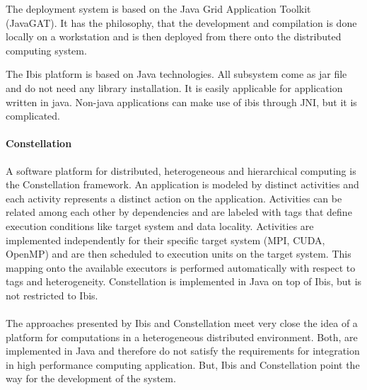 The deployment system is based on the Java Grid Application Toolkit
(JavaGAT).  It has the philosophy, that the development and
compilation is done locally on a workstation and is then deployed from
there onto the distributed computing system.

The Ibis platform is based on Java technologies. All subsystem come as
jar file and do not need any library installation. It is easily
applicable for application written in java. Non-java applications can
make use of ibis through JNI, but it is complicated.

\paragraph*{Constellation}
A software platform for distributed, heterogeneous and hierarchical
computing is the Constellation \cite{ref:constellation} framework. An
application is modeled by distinct activities and each activity
represents a distinct action on the application.  Activities can be
related among each other by dependencies and are labeled with tags
that define execution conditions like target system and data locality.
Activities are implemented independently for their specific target
system (MPI, CUDA, OpenMP) and are then scheduled to execution units
on the target system. This mapping onto the available executors is
performed automatically with respect to tags and
heterogeneity. Constellation is implemented in Java on top of Ibis,
but is not restricted to Ibis.

\paragraph*{}
The approaches presented by Ibis and Constellation meet very close the
idea of a platform for computations in a heterogeneous distributed
environment. Both, are implemented in Java and therefore do not
satisfy the requirements for integration in high performance computing
application. But, Ibis and Constellation point the way for the
development of the system.


\cleardoublepage

